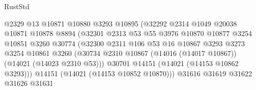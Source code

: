 \begin{lexlean}{RustStd}
\begin{coremodule}
                                        @2329
                                        @13
                                        @10871
                                        @10880
                                        @3293
                                        @10895
                                        (@32292
                                          @2314
                                          @1049
                                          @20038
                                          @10871
                                          @10878
                                          @8894
                                          (@32301
                                            @2313
                                            @53
                                            @55
                                            @3976
                                            @10870
                                            @10877
                                            @3254
                                            @10851
                                            @3260
                                            @30774
                                            (@32300
                                              @2311
                                              @106
                                              @53
                                              @16
                                              @10867
                                              @3293
                                              @3273
                                              @3254
                                              @10861
                                              @3260
                                              (@30734
                                                @2310
                                                @10867
                                                (@14016 (@14017 @10867))
                                                (@14021 (@14023 @2310 @53)))
                                              @30701
                                              @14151
                                              (@14021 (@14153 @10862 @3293)))
                                            @14151
                                            (@14021 (@14153 @10852 @10870)))
                                          @31616
                                          @31619
                                          @31622
                                          @31626
                                          @31631

\end{coremodule}
\end{lexlean}

